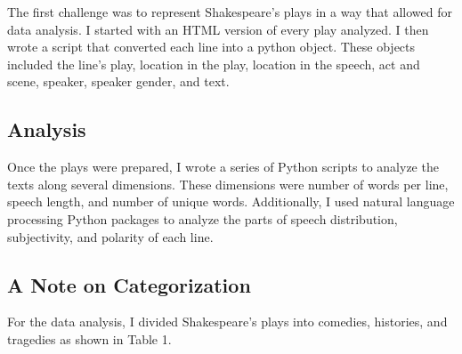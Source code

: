 \documentclass[12pt]{article} %
\begin{document}
	The first challenge was to represent Shakespeare’s plays in a way that allowed for data analysis. I started with an HTML version of every play analyzed. I then wrote a script that converted each line into a python object. These objects included the line’s play, location in the play, location in the speech, act and scene, speaker, speaker gender, and text.

\subsection{Analysis}
Once the plays were prepared, I wrote a series of Python scripts to analyze the texts along several dimensions. These dimensions were number of words per line, speech length, and number of unique words. Additionally, I used natural language processing Python packages to analyze the parts of speech distribution, subjectivity, and polarity of each line.

\subsection{A Note on Categorization}
For the data analysis, I divided Shakespeare's  plays into comedies, histories, and tragedies as shown in Table 1.
\end{document}
